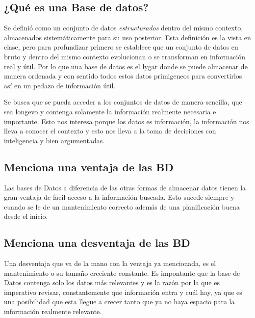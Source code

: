 \documentclass{article}
\begin{document}
\subsection{¿Qué es una Base de datos?}
Se definió como un conjunto de datos \emph{estructurados} dentro del mismo contexto, almacenados sistemáticamente 
para su uso posterior. 
Esta definición es la vista en clase, pero para profundizar primero se establece que un conjunto de datos en bruto 
y dentro del mismo contexto evolucionan o se transforman en información real y útil. Por lo que una base de datos 
es el lygar donde se puede almacenar de manera ordenada y con sentido todos estos datos primigeneos para convertirlos 
así en un pedazo de información útil. 

Se busca que se pueda acceder a los conjuntos de datos de manera sencilla, que sea longevo y contenga solamente la 
información realmente necesaria e importante. Esto nos interesa porque los datos es información, la información nos 
lleva a conocer el contexto y esto nos lleva a la toma de deciciones con inteligencia y bien argumentadas.

\subsection{Menciona una ventaja de las BD}
Las bases de Datos a diferencia de las otras formas de almacenar datos tienen la gran ventaja de facil acceso a la 
información buscada. Esto sucede siempre y cuando se le de un mantenimiento correcto además de una planificación buena 
desde el inicio. 

\subsection{Menciona  una desventaja de las BD}
Una desventaja que va de la mano con la ventaja ya mencionada, es el mantenimiento o su tamaño creciente constante. 
Es impontante que la base de Datos contenga solo los datos más relevantes y es la razón por la que es imperativo revisar, 
constantemente que información entra y cuál hay, ya que es una posibilidad que esta llegue a crecer tanto que ya no haya 
espacio para la información realmente relevante. 
\end{document}
